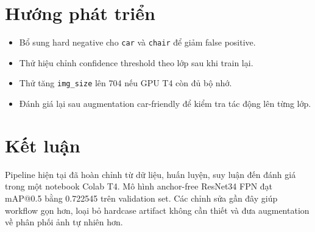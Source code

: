 \documentclass[12pt,a4paper]{article}
\begin{document}
\section{Hướng phát triển}

\begin{itemize}
  \item Bổ sung hard negative cho \texttt{car} và \texttt{chair} để giảm false positive.
  \item Thử hiệu chỉnh confidence threshold theo lớp sau khi train lại.
  \item Thử tăng \texttt{img\_size} lên 704 nếu GPU T4 còn đủ bộ nhớ.
  \item Đánh giá lại sau augmentation car-friendly để kiểm tra tác động lên từng lớp.
\end{itemize}

\section{Kết luận}

Pipeline hiện tại đã hoàn chỉnh từ dữ liệu, huấn luyện, suy luận đến đánh giá trong một notebook Colab T4. Mô hình anchor-free ResNet34 FPN đạt mAP@0.5 bằng 0.722545 trên validation set. Các chỉnh sửa gần đây giúp workflow gọn hơn, loại bỏ hardcase artifact không cần thiết và đưa augmentation về phân phối ảnh tự nhiên hơn.
\end{document}

